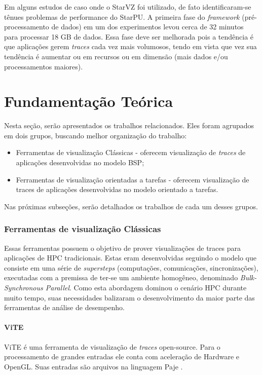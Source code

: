 \documentclass[prop-esp]{iiufrgs}
\begin{document}
Em alguns estudos de caso onde o StarVZ foi utilizado, de fato identificaram-se tênues problemas de performance do StarPU.
A primeira fase do \emph{framework} (pré-processamento de dados) em um dos experimentos levou cerca de 32 minutos para processar 18 GB de dados. Essa fase deve ser melhorada pois a tendência é que aplicações gerem \emph{traces} cada vez mais volumosos, tendo em vista que
vez sua tendência é aumentar ou em recursos ou em dimensão (mais dados e/ou processamentos maiores).


%
\chapter{Fundamentação Teórica}

Nesta seção, serão apresentados os trabalhos relacionados. Eles foram agrupados em dois grupos, buscando melhor organização do trabalho:

\begin{itemize}
\item Ferramentas de visualização Clássicas - oferecem visualização de \emph{traces} de aplicações desenvolvidas no modelo BSP;
\item Ferramentas de visualização orientadas a tarefas - oferecem visualização de traces de aplicações desenvolvidas no modelo orientado a tarefas.
\end{itemize}

Nas próximas subseções, serão detalhados os trabalhos de cada um desses grupos.

\subsection*{Ferramentas de visualização Clássicas}

Essas ferramentas possuem o objetivo de prover visualizações de traces para aplicações de HPC tradicionais. Estas eram desenvolvidas
seguindo o modelo que consiste em uma série de \emph{supersteps} (computações, comunicações, sincronizações), executadas com a premissa de ter-se um ambiente homogêneo, denominado \emph{Bulk-Synchronous Parallel}. Como esta abordagem  dominou o cenário HPC durante muito tempo, suas necessidades
balizaram o desenvolvimento da maior parte das ferramentas de análise de desempenho.

\subsubsection*{ViTE}
ViTE \cite{ref:vite} é uma ferramenta de visualização de \emph{traces} open-source. Para o processamento de grandes entradas ele conta com aceleração de Hardware e OpenGL. Suas entradas são arquivos na linguagem Paje \cite{ref:paje}.
\end{document}
